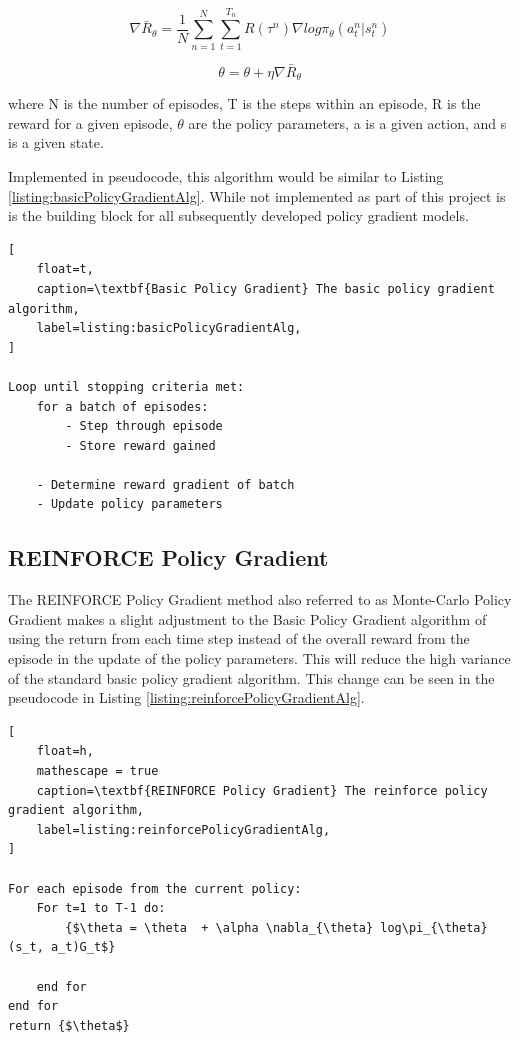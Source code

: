 \documentclass[conference]{IEEEtran}
\begin{document}
$$\nabla \bar{R}_{\theta} = \frac{1}{N} \sum \limits_{n=1}^N \sum \limits_{t=1}^{T_n} R(\tau^n) \nabla log\pi_{\theta}(a_{t}^n | s_{t}^n)$$

$$\theta = \theta  + \eta \nabla \bar{R}_{\theta}$$

where N is the number of episodes, T is the steps within an episode, R is the reward for a given episode, $\theta$ are the policy parameters, a is a given action, and s is a given state.

Implemented in pseudocode, this algorithm would be similar to Listing \ref{listing:basicPolicyGradientAlg}.
While not implemented as part of this project is is the building block for all subsequently developed policy gradient models.

\begin{lstlisting}[
    float=t,
    caption=\textbf{Basic Policy Gradient} The basic policy gradient algorithm,
    label=listing:basicPolicyGradientAlg,
]

Loop until stopping criteria met:
    for a batch of episodes:
        - Step through episode
        - Store reward gained

    - Determine reward gradient of batch
    - Update policy parameters
\end{lstlisting}

\subsection{REINFORCE Policy Gradient}
The REINFORCE Policy Gradient method also referred to as Monte-Carlo Policy Gradient makes a slight adjustment to the Basic Policy Gradient algorithm of using the return from each time step instead of the overall reward from the episode in the update of the policy parameters. This will reduce the high variance of the standard basic policy gradient algorithm.
This change can be seen in the pseudocode in Listing \ref{listing:reinforcePolicyGradientAlg}. 

\begin{lstlisting}[
    float=h,
    mathescape = true
    caption=\textbf{REINFORCE Policy Gradient} The reinforce policy gradient algorithm,
    label=listing:reinforcePolicyGradientAlg,
]

For each episode from the current policy:
    For t=1 to T-1 do:
        {$\theta = \theta  + \alpha \nabla_{\theta} log\pi_{\theta}(s_t, a_t)G_t$}

    end for
end for
return {$\theta$}
\end{lstlisting}
\end{document}
